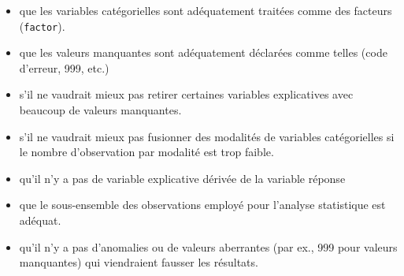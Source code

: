 \documentclass[
  11pt,
  letterpaper,
]{scrbook}
\providecommand{\tightlist}{%
  \setlength{\itemsep}{0pt}\setlength{\parskip}{0pt}}\usepackage{longtable,booktabs,array}
\theoremstyle{plain}
\theoremstyle{plain}
\theoremstyle{definition}
\theoremstyle{definition}
\theoremstyle{remark}
\begin{document}
\begin{itemize}
\tightlist
\item
  que les variables catégorielles sont adéquatement traitées comme des
  facteurs (\texttt{factor}).
\item
  que les valeurs manquantes sont adéquatement déclarées comme telles
  (code d'erreur, 999, etc.)
\item
  s'il ne vaudrait mieux pas retirer certaines variables explicatives
  avec beaucoup de valeurs manquantes.
\item
  s'il ne vaudrait mieux pas fusionner des modalités de variables
  catégorielles si le nombre d'observation par modalité est trop faible.
\item
  qu'il n'y a pas de variable explicative dérivée de la variable réponse
\item
  que le sous-ensemble des observations employé pour l'analyse
  statistique est adéquat.
\item
  qu'il n'y a pas d'anomalies ou de valeurs aberrantes (par ex., 999
  pour valeurs manquantes) qui viendraient fausser les résultats.
\end{itemize}
\end{document}
